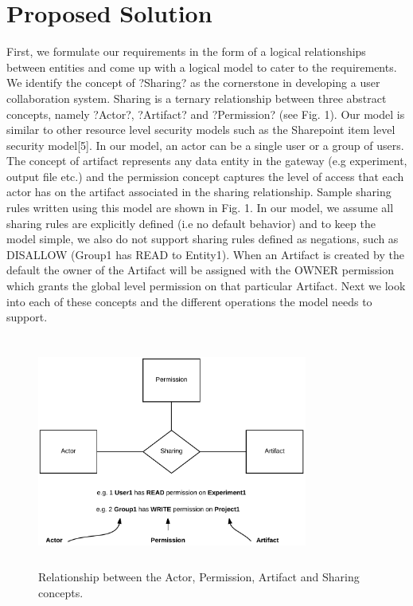 \documentclass[sigconf]{acmart}
\begin{document}
\section{Proposed Solution}
First, we formulate our requirements in the form of a logical relationships between entities and come up with a logical model to cater to the requirements. We identify the concept of ?Sharing? as the cornerstone in developing a user collaboration system. Sharing is a ternary relationship between three abstract concepts, namely ?Actor?, ?Artifact? and ?Permission? (see Fig. 1). Our model is similar to other resource level security models such as the Sharepoint item level security model[5]. In our model, an actor can be a single user or a group of users. The concept of artifact represents any data entity in the gateway (e.g experiment, output file etc.) and the permission concept captures the level of access that each actor has on the artifact associated in the sharing relationship. Sample sharing rules written using this model are shown in Fig. 1. In our model, we assume all sharing rules are explicitly defined (i.e no default behavior) and to keep the model simple, we also do not support sharing rules defined as negations, such as DISALLOW (Group1 has READ to Entity1). When an Artifact is created by the default the owner of the Artifact will be assigned with the OWNER permission which grants the global level permission on that particular Artifact. Next we look into each of these concepts and the different operations the model needs to support.

\begin{figure}
\includegraphics[height=3in, width=3.5in]{figures/sharing-concepts.pdf}
\caption{Relationship between the Actor, Permission, Artifact and Sharing concepts.}
\end{figure}
\end{document}
